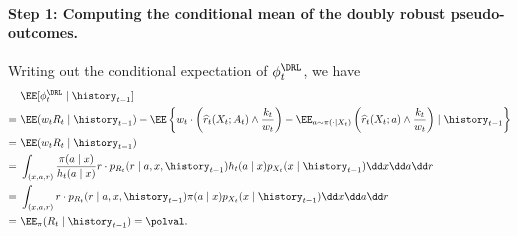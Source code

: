 \paragraph{Step 1: Computing the conditional mean of the doubly robust pseudo-outcomes.}
Writing out the conditional expectation of $\phi_t^\DRL$, we have
\begin{align*}
  &\EE[\phi_t^\DRL \mid \history_{t-1}] \\
  = \ &\EE (w_t R_t \mid \history_{t-1}) - \EE \left \{ w_t \cdot \left (\widehat r_t(X_t; A_t) \land \frac{k_t}{w_t} \right ) - \EE_{a \sim \pi(\cdot \mid X_t)} \left ( \widehat r_t(X_t; a) \land \frac{k_t}{w_t} \right ) \mid \history_{t-1} \right \} \\ = \ & \EE (w_t R_t \mid \history_{t-1}) \\
  =\ &\int_{(x,a,r)} \frac{\pi(a \mid x)}{h_t(a\mid x)} r \cdot p_{R_t} (r \mid a, x, \history_{t-1}) h_t(a \mid x) p_{X_t}(x \mid \history_{t-1}) \dd x \dd a \dd r\\
  =\ &\int_{(x,a,r)} r \cdot p_{R_t} (r \mid a, x, \history_{t-1}) \pi(a \mid x) p_{X_t}(x \mid \history_{t-1}) \dd x \dd a \dd r\\
  = \ &\EE_\pi (R_t \mid \history_{t-1}) = \polval.
\end{align*}


